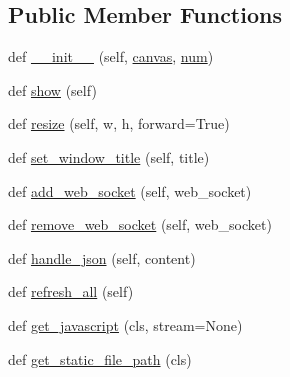 \subsection*{Public Member Functions}
\begin{DoxyCompactItemize}
\item 
def \hyperlink{classmatplotlib_1_1backends_1_1backend__webagg__core_1_1FigureManagerWebAgg_a0c8cc76f34779613a6689bb9d9fdf875}{\+\_\+\+\_\+init\+\_\+\+\_\+} (self, \hyperlink{classmatplotlib_1_1backend__bases_1_1FigureManagerBase_ae355aa0633d6b4da5e2e698b007b4c3f}{canvas}, \hyperlink{classmatplotlib_1_1backend__bases_1_1FigureManagerBase_aba55ac119779c90c08e4034713892c63}{num})
\item 
def \hyperlink{classmatplotlib_1_1backends_1_1backend__webagg__core_1_1FigureManagerWebAgg_a465425fcce04d961adec926e26e50f0a}{show} (self)
\item 
def \hyperlink{classmatplotlib_1_1backends_1_1backend__webagg__core_1_1FigureManagerWebAgg_a6681d695a521990728eb55058bb70af7}{resize} (self, w, h, forward=True)
\item 
def \hyperlink{classmatplotlib_1_1backends_1_1backend__webagg__core_1_1FigureManagerWebAgg_ab16a64251547fc014e8377102b529bc9}{set\+\_\+window\+\_\+title} (self, title)
\item 
def \hyperlink{classmatplotlib_1_1backends_1_1backend__webagg__core_1_1FigureManagerWebAgg_a5d5d87f6859c5d25941cd4a2d62d2e0e}{add\+\_\+web\+\_\+socket} (self, web\+\_\+socket)
\item 
def \hyperlink{classmatplotlib_1_1backends_1_1backend__webagg__core_1_1FigureManagerWebAgg_a787c297b8e493864a2d25d271dcdaadb}{remove\+\_\+web\+\_\+socket} (self, web\+\_\+socket)
\item 
def \hyperlink{classmatplotlib_1_1backends_1_1backend__webagg__core_1_1FigureManagerWebAgg_ac53b50e253d249ab9317abdcdbd5601a}{handle\+\_\+json} (self, content)
\item 
def \hyperlink{classmatplotlib_1_1backends_1_1backend__webagg__core_1_1FigureManagerWebAgg_a98581470a38b25ea8bedd232cf04f73f}{refresh\+\_\+all} (self)
\item 
def \hyperlink{classmatplotlib_1_1backends_1_1backend__webagg__core_1_1FigureManagerWebAgg_aa6ffb5f02e34e7c2169e1ea17034974a}{get\+\_\+javascript} (cls, stream=None)
\item 
def \hyperlink{classmatplotlib_1_1backends_1_1backend__webagg__core_1_1FigureManagerWebAgg_acfd6b67e5f7b5ef97b9669051fd8452f}{get\+\_\+static\+\_\+file\+\_\+path} (cls)
\end{DoxyCompactItemize}

